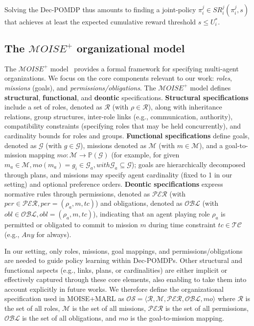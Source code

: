 \documentclass[pdflatex,sn-mathphys-num]{sn-jnl}%
\theoremstyle{thmstyleone}%
\theoremstyle{thmstyletwo}%
\theoremstyle{thmstylethree}%
\begin{document}
\noindent Solving the Dec-POMDP thus amounts to finding a joint-policy $\pi^j_i \in SR^j_i(\pi^j_i, s)$ that achieves at least the expected cumulative reward threshold $s \leq U_i^*$.

\subsection{The $\mathcal{M}OISE^+$ organizational model}

The $\mathcal{M}OISE^+$ model~\cite{Hubner2002, Hubner2007} provides a formal framework for specifying multi-agent organizations. We focus on the core components relevant to our work: \textit{roles}, \textit{missions} (goals), and \textit{permissions/obligations}.
%
The $\mathcal{M}OISE^+$ model defines \textbf{structural}, \textbf{functional}, and \textbf{deontic} specifications. \textbf{Structural specifications} include a set of roles, denoted as $\mathcal{R}$ (with $\rho \in \mathcal{R}$), along with inheritance relations, group structures, inter-role links (e.g., communication, authority), compatibility constraints (specifying roles that may be held concurrently), and cardinality bounds for roles and groups. \textbf{Functional specifications} define goals, denoted as $\mathcal{G}$ (with $g \in \mathcal{G}$), missions denoted as $\mathcal{M}$ (with $m \in \mathcal{M}$), and a goal-to-mission mapping $mo: \mathcal{M} \rightarrow \mathbb{P}(\mathcal{G})$ (for example, for given $m_a \in \mathcal{M}, mo(m_a) = {g_i \in \mathcal{G}_a}, with \mathcal{G}_a \subseteq \mathcal{G}$); goals are hierarchically decomposed through plans, and missions may specify agent cardinality (fixed to 1 in our setting) and optional preference orders. \textbf{Deontic specifications} express normative rules through permissions, denoted as $\mathcal{PER}$ (with $per \in \mathcal{PER}, per = (\rho_a, m, tc)$) and obligations, denoted as $\mathcal{OBL}$ (with $obl \in \mathcal{OBL}, obl = (\rho_a, m, tc)$), indicating that an agent playing role $\rho_a$ is permitted or obligated to commit to mission $m$ during time constraint $tc \in \mathcal{TC}$ (e.g., $Any$ for always).

\noindent In our setting, only roles, missions, goal mappings, and permissions/obligations are needed to guide policy learning within Dec-POMDPs. Other structural and functional aspects (e.g., links, plans, or cardinalities) are either implicit or effectively captured through these core elements, also enabling to take them into account explicitly in future works. We therefore define the organizational specification used in MOISE+MARL as $\mathcal{OS} = \langle \mathcal{R}, \mathcal{M}, \mathcal{PER}, \mathcal{OBL}, mo \rangle$ where $\mathcal{R}$ is the set of all roles, $\mathcal{M}$ is the set of all missions, $\mathcal{PER}$ is the set of all permissions, $\mathcal{OBL}$ is the set of all obligations, and $mo$ is the goal-to-mission mapping.
\end{document}
